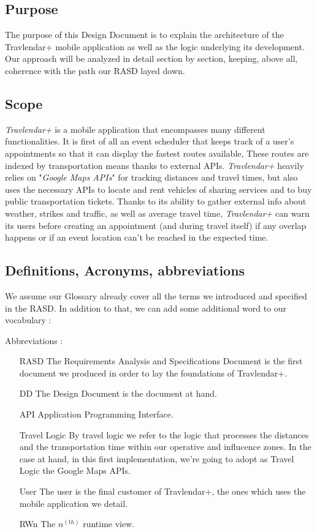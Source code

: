 \subsection{Purpose}
The purpose of this Design Document is to explain the architecture of the Travlendar+ mobile application as well as the logic underlying its development. Our approach will be analyzed in detail section by section, keeping, above all, coherence with the path our RASD layed down.

\subsection{Scope}
\textit{Travlendar+} is a mobile application that encompasses many different functionalities. 
It is first of all an event scheduler that keeps track of a user’s appointments so that it can display the fastest routes available, These routes are indexed by transportation means thanks to external APIs.
\textit{Travlendar+} heavily relies on "\textit{Google Maps APIs}" for tracking distances and travel times, but also uses the necessary APIs to locate and rent vehicles of sharing services and to buy public transportation tickets. Thanks to its ability to gather external info about weather, strikes and traffic, as well as average travel time, \textit{Travlendar+} can warn its users before creating an appointment (and during travel itself) if any overlap happens or if an event location can’t be reached in the expected time.

\subsection{Definitions, Acronyms, abbreviations}
We assume our Glossary already cover all the terms we introduced and specified in the RASD. In addition to that, we can add some additional word to our vocabulary :

Abbreviations :
\begin{itemize}
	\item[RASD] The Requirements Analysis and Specifications Document is the first document we produced in order to lay the foundations of Travlendar+.
	\item[DD] The Design Document is the document at hand.
	\item[API] Application Programming Interface.
	\item[Travel Logic] By travel logic we refer to the logic that processes the distances and the transportation time within our operative and influcence zones. In the case at hand, in this first implementation, we're going to adopt as Travel Logic the Google Maps APIs.
	\item[User]  The user is the final customer of Travlendar+, the ones which uses the mobile application we detail.
	\item [RWn] The $n^{(th)}$ runtime view.
\end{itemize}


